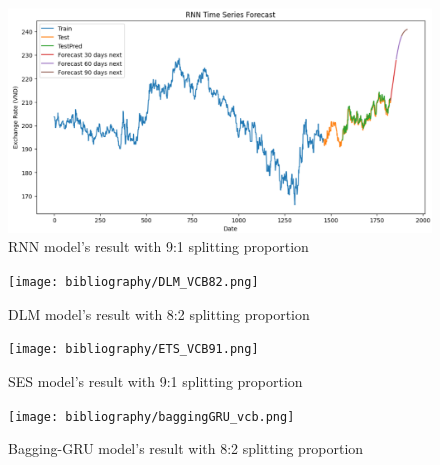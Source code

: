 \documentclass{ieeeojies}
\begin{document}
\begin{figure}[H]
  \centering
  \begin{minipage}{0.8\linewidth}
    \centering
    \includegraphics[width=\linewidth]{RNN_EUR.png}
    \caption{RNN model's result with 9:1 splitting proportion}
    \label{fig12}
  \end{minipage}
\end{figure}
\begin{figure}[H]
  \centering
  \begin{minipage}{0.8\linewidth}
    \centering
    \texttt{[image: bibliography/DLM\_VCB82.png]}
    \caption{DLM model's result with 8:2 splitting proportion}
    \label{fig13}
  \end{minipage}
\end{figure}
\begin{figure}[H]
  \centering
  \begin{minipage}{0.8\linewidth}
    \centering
    \texttt{[image: bibliography/ETS\_VCB91.png]}
    \caption{SES model's result with 9:1 splitting proportion}
    \label{fig14}
  \end{minipage}
\end{figure}
\begin{figure}[H]
  \centering
  \begin{minipage}{0.8\linewidth}
    \centering
    \texttt{[image: bibliography/baggingGRU\_vcb.png]}
    \caption{Bagging-GRU model's result with 8:2 splitting proportion}
    \label{bagginggru}
  \end{minipage}
\end{figure}
\end{document}
